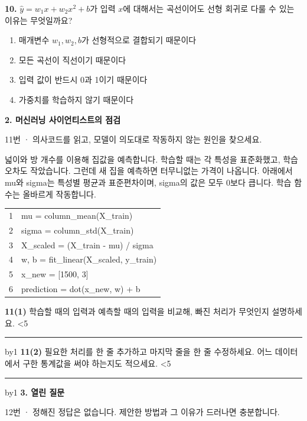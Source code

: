\documentclass[11pt,a4paper]{article}
\newcommand{\parttitle}[2]{{\large\bfseries\color{ink} #1}\par{\small #2}\par\vspace{5mm}}
\newcommand{\question}[2]{\textbf{#1.} #2\par}
\newcommand{\answerlines}[1]{\foreachline{#1}}
\newcommand{\foreachline}[1]{\linecount=0\loop\ifnum\linecount<#1\vspace{8mm}\par{\color{rulegray}\hrule}\advance\linecount by1\repeat}
\begin{document}
\question{10}{$\hat y=w_1x+w_2x^2+b$가 입력 $x$에 대해서는 곡선이어도 선형 회귀로 다룰 수 있는 이유는 무엇일까요?}
\begin{enumerate}[label=(\arabic*),leftmargin=9mm,itemsep=0pt,topsep=2pt,parsep=0pt]
\item 매개변수 $w_1,w_2,b$가 선형적으로 결합되기 때문이다
\item 모든 곡선이 직선이기 때문이다
\item 입력 값이 반드시 0과 1이기 때문이다
\item 가중치를 학습하지 않기 때문이다
\end{enumerate}\vfill
\newpage
\parttitle{2. 머신러닝 사이언티스트의 점검}{11번 · 의사코드를 읽고, 모델이 의도대로 작동하지 않는 원인을 찾으세요.}
넓이와 방 개수를 이용해 집값을 예측합니다. 학습할 때는 각 특성을 표준화했고, 학습 오차도 작았습니다. 그런데 새 집을 예측하면 터무니없는 가격이 나옵니다. 아래에서 mu와 sigma는 특성별 평균과 표준편차이며, sigma의 값은 모두 0보다 큽니다. 학습 함수는 올바르게 작동합니다.
\par\vspace{3mm}
{\small\ttfamily\begin{tabular}{r l}
1 & \hspace*{0.0mm}mu = column\_mean(X\_train) \\
2 & \hspace*{0.0mm}sigma = column\_std(X\_train) \\
3 & \hspace*{0.0mm}X\_scaled = (X\_train - mu) / sigma \\
4 & \hspace*{0.0mm}w, b = fit\_linear(X\_scaled, y\_train) \\
5 & \hspace*{0.0mm}x\_new = [1500, 3] \\
6 & \hspace*{0.0mm}prediction = dot(x\_new, w) + b \\
\end{tabular}}\par\vspace{5mm}
\textbf{11(1)} 학습할 때의 입력과 예측할 때의 입력을 비교해, 빠진 처리가 무엇인지 설명하세요.
\answerlines{5}
\vspace{6mm}
\textbf{11(2)} 필요한 처리를 한 줄 추가하고 마지막 줄을 한 줄 수정하세요. 어느 데이터에서 구한 통계값을 써야 하는지도 적으세요.
\answerlines{5}
\vspace{6mm}
\newpage
\parttitle{3. 열린 질문}{12번 · 정해진 정답은 없습니다. 제안한 방법과 그 이유가 드러나면 충분합니다.}
\end{document}
